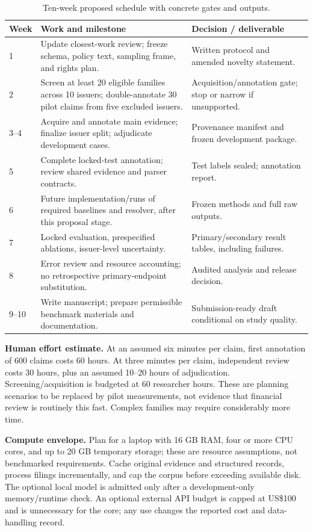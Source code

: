 \documentclass[11pt,a4paper]{article}
\newcommand{\lead}[1]{\textbf{\color{navy}#1}}
\begin{document}
\begin{table}[H]\caption{Ten-week proposed schedule with concrete gates and outputs.}
\small\begin{tabularx}{\linewidth}{p{.10\linewidth}YY}\toprule
Week & Work and milestone & Decision / deliverable\\ & Update closest-work review; freeze schema, policy text, sampling frame, and rights plan. & Written protocol and amended novelty statement.\\
2 & Screen at least 20 eligible families across 10 issuers; double-annotate 30 pilot claims from five excluded issuers. & Acquisition/annotation gate; stop or narrow if unsupported.\\
3--4 & Acquire and annotate main evidence; finalize issuer split; adjudicate development cases. & Provenance manifest and frozen development package.\\
5 & Complete locked-test annotation; review shared evidence and parser contracts. & Test labels sealed; annotation report.\\
6 & Future implementation/runs of required baselines and resolver, after this proposal stage. & Frozen methods and full raw outputs.\\
7 & Locked evaluation, prespecified ablations, issuer-level uncertainty. & Primary/secondary result tables, including failures.\\
8 & Error review and resource accounting; no retrospective primary-endpoint substitution. & Audited analysis and release decision.\\
9--10 & Write manuscript; prepare permissible benchmark materials and documentation. & Submission-ready draft conditional on study quality.\\\bottomrule
\end{tabularx}\end{table}

\lead{Human effort estimate.} At an assumed six minutes per claim, first annotation of 600 claims costs 60 hours. At three minutes per claim, independent review costs 30 hours, plus an assumed 10--20 hours of adjudication. Screening/acquisition is budgeted at 60 researcher hours. These are planning scenarios to be replaced by pilot measurements, not evidence that financial review is routinely this fast. Complex families may require considerably more time.

\lead{Compute envelope.} Plan for a laptop with 16 GB RAM, four or more CPU cores, and up to 20 GB temporary storage; these are resource assumptions, not benchmarked requirements. Cache original evidence and structured records, process filings incrementally, and cap the corpus before exceeding available disk. The optional local model is admitted only after a development-only memory/runtime check. An optional external API budget is capped at US\$100 and is unnecessary for the core; any use changes the reported cost and data-handling record.
\end{document}
